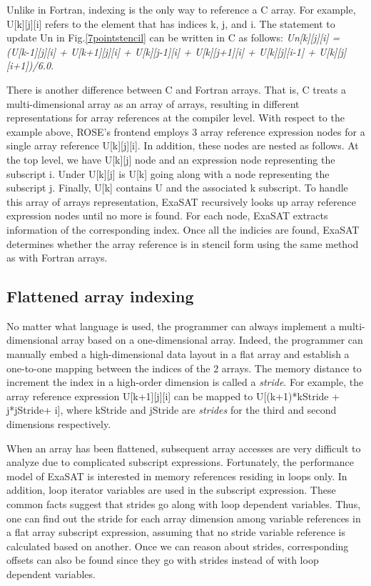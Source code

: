 \documentclass{article}
\begin{document}
Unlike in Fortran, indexing is the only way to reference a C array.
For example, U[k][j][i] refers to the element that has indices k, j, and i.
The statement to update Un in Fig.\ref{7pointstencil} can be written in C as follows: {\em Un[k][j][i] =  (U[k-1][j][i] + U[k+1][j][i] + U[k][j-1][i] + U[k][j+1][i] + U[k][j][i-1] + U[k][j][i+1])/6.0}.

There is another difference between C and Fortran arrays.
That is, C treats a multi-dimensional array as an array of arrays, resulting in different representations for array references at the compiler level.
With respect to the example above, ROSE's frontend employs 3 array reference expression nodes for a single array reference U[k][j][i].
In addition, these nodes are nested as follows.
At the top level, we have U[k][j] node and an expression node representing the subscript i.
Under U[k][j] is U[k] going along with a node representing the subscript j.
Finally, U[k] contains U and the associated k subscript.
To handle this array of arrays representation, ExaSAT recursively looks up array reference expression nodes until no more is found.
For each node, ExaSAT extracts information of the corresponding index.
Once all the indicies are found, ExaSAT determines whether the array reference is in stencil form using the same method as with Fortran arrays.

\subsection{Flattened array indexing}
No matter what language is used, the programmer can always implement a multi-dimensional array based on a one-dimensional array.
Indeed, the programmer can manually embed a high-dimensional data layout in a flat array and establish a one-to-one mapping between the indices of the 2 arrays. 
The memory distance to increment the index in a high-order dimension is called a {\em stride}. 
For example, the array reference expression U[k+1][j][i]  can be mapped to U[(k+1)*kStride + j*jStride+ i], where kStride and jStride are {\em strides} for the third and second dimensions respectively.

When an array has been flattened, subsequent array accesses are very difficult to analyze due to complicated subscript expressions.
Fortunately, the performance model of ExaSAT is interested in memory references residing in loops only.
In addition, loop iterator variables are used in the subscript expression. 
These common facts suggest that strides go along with loop dependent variables.
Thus, one can find out the stride for each array dimension among variable references in a flat array subscript expression, assuming that no stride variable reference is calculated based on another.
Once we can reason about strides, corresponding offsets can also be found since they go with strides instead of with loop dependent variables. 
\end{document}
